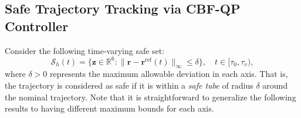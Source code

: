 \documentclass[journal,10pt]{IEEEtran}
\newcommand{\vect}[1]{\boldsymbol{\mathbf{#1}}}
\newif\ifdraft
\newcommand{\XX}[1]{\ifdraft{\color{red}[{\bf XX}: #1]}\fi}
\begin{document}

\subsection{Safe Trajectory Tracking via CBF-QP Controller}
Consider the following time-varying safe set:
\begin{equation}\label{eqS}
    \mathcal{S}_h(t) = \{\vect{z}\in\mathbb{R}^6: \|\vect{r}-\vect{r}^{\text{ref}}(t) \|_{\infty} \leq \delta\}, \quad t\in[\tau_0, \tau_v),
\end{equation}
where $\delta>0$ represents the maximum allowable deviation in each axis. That is, the trajectory is considered as safe if it is within a \emph{safe tube} of radius $\delta$ around the nominal trajectory. Note that it is straightforward to generalize the following results to having different maximum bounds for each axis. 
\end{document}
